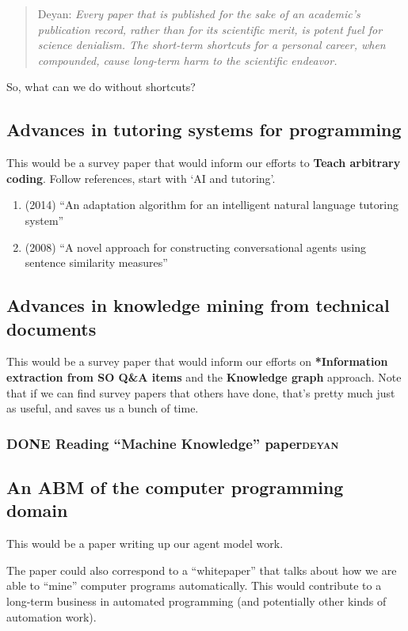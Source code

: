 \documentclass[11pt]{article}
\begin{document}
\begin{quote}
Deyan: \emph{Every paper that is published for the sake of an academic's publication record, rather than for its scientific merit, is potent fuel for science denialism. The short-term shortcuts for a personal career, when compounded, cause long-term harm to the scientific endeavor.}
\end{quote}

So, what can we do without shortcuts?

\subsection{Advances in tutoring systems for programming}
\label{sec:orge1eef2a}
This would be a survey paper that would inform our efforts to \textbf{Teach arbitrary coding}.
Follow references, start with ‘AI and tutoring’.

\begin{enumerate}
\item (2014) ``An adaptation algorithm for an intelligent natural language tutoring system''
\item (2008) ``A novel approach for constructing conversational agents using sentence similarity measures''
\end{enumerate}
\subsection{Advances in knowledge mining from technical documents}
\label{sec:orgc77e21d}
This would be a survey paper that would inform our efforts on
\textbf{*Information extraction from SO Q\&A items} and the \textbf{Knowledge graph}
approach.  Note that if we can find survey papers that others have
done, that’s pretty much just as useful, and saves us a bunch of time.

\subsubsection{{\bfseries\sffamily DONE} Reading ``Machine Knowledge'' paper\hfill{}\textsc{deyan}}
\label{sec:org57b15ec}
\subsection{An ABM of the computer programming domain}
\label{sec:org630d1ee}
This would be a paper writing up our agent model work.

The paper could also correspond to a “whitepaper” that talks about how
we are able to “mine” computer programs automatically.  This would
contribute to a long-term business in automated programming (and
potentially other kinds of automation work).
\end{document}
